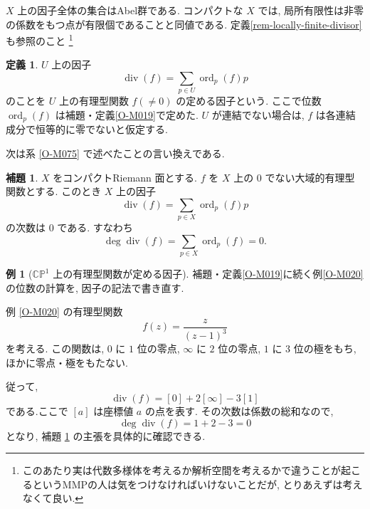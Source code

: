 \documentclass[dvipdfmx,a4paper,11pt]{article} %
\newcommand{\C}{\mathbb{C}}
\theoremstyle{definition}
\numberwithin{equation}{section}
\newtheorem{lem}[thm]{補題}
\newtheorem{dfn}[thm]{定義}
\newtheorem{exa}[thm]{例}
\begin{document}
$X$ 上の因子全体の集合はAbel群である.
コンパクトな $X$ では, 局所有限性は非零の係数をもつ点が有限個であることと同値である. 定義\ref{rem-locally-finite-divisor}も参照のこと
\footnote{このあたり実は代数多様体を考えるか解析空間を考えるかで違うことが起こるというMMPの人は気をつけなければいけないことだが, とりあえずは考えなくて良い.}

\begin{dfn}\label{O-M197}
$U$ 上の因子
\[
\operatorname{div}(f)=\sum_{p\in U}\operatorname{ord}_p(f)p
\]
のことを $U$ 上の有理型関数 $f(\ne 0)$ の定める因子という. 
ここで位数 $\operatorname{ord}_p(f)$ は補題・定義\ref{O-M019}で定めた. $U$ が連結でない場合は, $f$ は各連結成分で恒等的に零でないと仮定する.

\end{dfn}


次は系 \ref{O-M075} で述べたことの言い換えである.
\begin{lem}\label{O-M198}
$X$ をコンパクトRiemann 面とする. $f$ を $X$ 上の $0$ でない大域的有理型関数とする. このとき $X$ 上の因子
\[
\operatorname{div}(f)=\sum_{p\in X}\operatorname{ord}_p(f)p
\]
の次数は $0$ である. すなわち
\[
\deg \operatorname{div}(f)=\sum_{p\in X}\operatorname{ord}_p(f)=0.
\]
\end{lem}

\begin{exa}[$\C\mathbb P^1$ 上の有理型関数が定める因子]
補題・定義\ref{O-M019}に続く例\ref{O-M020}の位数の計算を, 因子の記法で書き直す.

例 \ref{O-M020} の有理型関数
\[
f(z)=\frac{z}{(z-1)^3}
\]
を考える.
この関数は, $0$ に $1$ 位の零点, 
$\infty$ に $2$ 位の零点, $1$ に $3$ 位の極をもち, 
ほかに零点・極をもたない.

従って, 
\[
\operatorname{div}(f)=[0]+2[\infty]-3[1]
\]
である.ここで $[a]$ は座標値 $a$ の点を表す.
その次数は係数の総和なので, 
\[
\deg\operatorname{div}(f)=1+2-3=0
\]
となり, 補題 \ref{O-M198} の主張を具体的に確認できる.
\end{exa}
\end{document}
